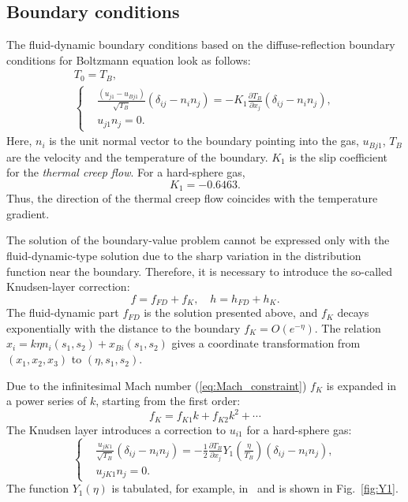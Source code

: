 \documentclass[smallextended, referee]{svjour3} %
\newcommand{\pder}[2][]{\frac{\partial#1}{\partial#2}}
\begin{document}
\subsection{Boundary conditions}

The fluid-dynamic boundary conditions based on the diffuse-reflection boundary conditions
for Boltzmann equation look as follows:
\begin{gather}
	T_0 = T_B, \label{eq:bound:T} \\
	\left\{
	\begin{aligned}
		& \frac{(u_{j1}-u_{Bj1})}{\sqrt{T_B}}(\delta_{ij}-n_in_j) =
			-K_1\pder[T_B]{x_j}(\delta_{ij}-n_in_j), \\
		& u_{j1}n_j = 0.
	\end{aligned}
	\right. \label{eq:bound:v}
\end{gather}
Here, \(n_i\) is the unit normal vector to the boundary pointing into the gas,
\(u_{Bj1}\), \(T_B\) are the velocity and the temperature of the boundary.
\(K_1\) is the slip coefficient for the \emph{thermal creep flow}. For a hard-sphere gas,
\[ K_1 = -0.6463. \]
Thus, the direction of the thermal creep flow coincides with the temperature gradient.

The solution of the boundary-value problem cannot be expressed only with the fluid-dynamic-type
solution due to the sharp variation in the distribution function near the boundary.
Therefore, it is necessary to introduce the so-called Knudsen-layer correction:
\begin{equation}
	f = f_{FD} + f_K, \quad h = h_{FD} + h_K.
\end{equation}
The fluid-dynamic part \(f_{FD}\) is the solution presented above,
and \(f_K\) decays exponentially with the distance to the boundary \(f_K = O\left(e^{-\eta}\right)\).
The relation \( x_i = k\eta n_i(s_1,s_2) + x_{Bi}(s_1, s_2) \) gives a coordinate transformation
from \((x_1,x_2,x_3)\) to \((\eta,s_1,s_2)\).

Due to the infinitesimal Mach number (\ref{eq:Mach_constraint}) \(f_K\) is expanded
in a power series of \(k\), starting from the first order:
\[ f_K = f_{K1} k + f_{K2} k ^ 2 + \cdots \]
The Knudsen layer introduces a correction to \(u_{i1}\) for a hard-sphere gas:
\begin{equation}
	\left\{
	\begin{aligned}
		& \frac{u_{jK1}}{\sqrt{T_B}}(\delta_{ij}-n_in_j) =
			-\frac12\pder[T_B]{x_j} Y_1\left(\frac\eta{T_B}\right) (\delta_{ij}-n_in_j), \\
		& u_{jK1}n_j = 0.
	\end{aligned}
	\right. \label{eq:bound:v_K}
\end{equation}
The function \(Y_1(\eta)\) is tabulated, for example, in~\cite{Sone2002, Sone2007} and is shown in Fig.~\ref{fig:Y1}.
\end{document}
